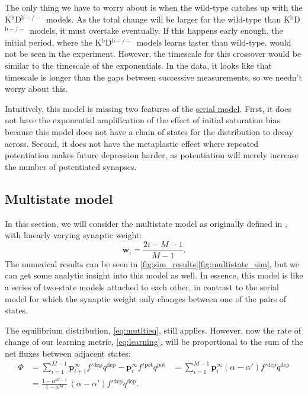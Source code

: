 \documentclass[10pt]{article}
\newcommand{\pr}{\mathbf{p}}
\newcommand{\eq}{\pr^\infty}
\newcommand{\w}{\mathbf{w}}
\newcommand{\pot}{^{\text{pot}}}
\newcommand{\dep}{^{\text{dep}}}
\newcommand{\KO}{K$^\mathrm{b}$D$^{\mathrm{b}-/-}$}
\begin{document}
The only thing we have to worry about is when the wild-type catches up with the \KO\ models.
As the total change will be larger for the wild-type than \KO\ models, it must overtake eventually.
If this happens early enough, the initial period, where the \KO\ models learns faster than wild-type, would not be seen in the experiment.
However, the timescale for this crossover would be similar to the timescale of the exponentials.
In the data, it looks like that timescale is longer than the gaps between successive measurements, so we needn't worry about this.

Intuitively, this model is missing two features of the \hyperref[sec:multistate]{serial model}.
First, it does not have the exponential amplification of the effect of initial saturation bias because this model does not have a chain of states for the distribution to decay across.
Second, it does not have the metaplastic effect where repeated potentiation makes future depression harder, as potentiation will merely increase the number of potentiated synapses.


\subsection{Multistate model}\label{sec:multistate_lin}



In this section, we will consider the multistate model as originally defined in \cite{amit1994learning}, \ie with linearly varying synaptic weight:
%
\begin{equation}\label{eq:multistateLinWeight}
  \w_i = \frac{2i-M-1}{M-1}.
\end{equation}
%
The numerical results can be seen in
\autoref{fig:sim_results}\ref{fig:multistate_sim}, %
but we can get some analytic insight into this model as well.
In essence, this model is like a series of two-state models attached to each other, in contrast to the serial model for which the synaptic weight only changes between one of the pairs of states.


The equilibrium distribution, \eqref{eq:mutltieq}, still applies.
However, now the rate of change of our learning metric, \eqref{eq:learning}, will be proportional to the sum of the net fluxes between adjacent states:
%
\begin{equation}\label{eq:multiLinFlux}
  \begin{aligned}
    \Phi &= \sum_{i=1}^{M-1} \eq_{i+1} f'{}\dep q\dep - \eq_i f'{}\pot q\pot
         &= \sum_{i=1}^{M-1} \eq_i (\alpha-\alpha') f'{}\dep q\dep \\
         &= \frac{1-\alpha^{M-1}}{1-\alpha^M} \, (\alpha-\alpha') f'{}\dep q\dep.
  \end{aligned}
\end{equation}
%
\end{document}
